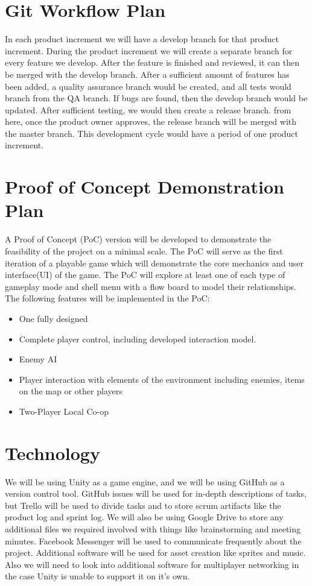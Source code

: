 \documentclass{article}
\begin{document}
\section{Git Workflow Plan}
In each product increment we will have a develop branch for that product increment. During the product increment we will create a separate branch for every feature we develop. After the feature is finished and reviewed, it can then be merged with the develop branch. After a sufficient amount of features has been added, a quality assurance branch would be created, and all tests would branch from the QA branch. If bugs are found, then the develop branch would be updated. After sufficient testing, we would then create a release branch. from here, once the product owner approves, the release branch will be merged with the master branch. This development cycle would have a period of one product increment.

\section{Proof of Concept Demonstration Plan}
A Proof of Concept (PoC) version will be developed to demonstrate the feasibility of the project on a minimal scale. The PoC will serve as the first iteration of a playable game which will demonstrate the core mechanics and user interface(UI) of the game. The PoC will explore at least one of each type of gameplay mode and shell menu with a flow board to model their relationships. The following features will be implemented in the PoC:

\begin{itemize}

\item One fully designed 
\item Complete player control, including developed interaction model.
\item Enemy AI 
\item Player interaction with elements of the environment including enemies, items on the map or other players
\item Two-Player Local Co-op

\end{itemize}

\section{Technology}
We will be using Unity as a game engine, and we will be using GitHub as a version control tool. GitHub issues will be used for in-depth descriptions of tasks, but Trello will be used to divide tasks and to store scrum artifacts like the product log and sprint log. We will also be using Google Drive to store any additional files we required involved with things like brainstorming and meeting minutes. Facebook Messenger will be used to communicate frequently about the project. Additional software will be used for asset creation like sprites and music. Also we will need to look into additional software for multiplayer networking in the case Unity is unable to support it on it's own. 
\end{document}
